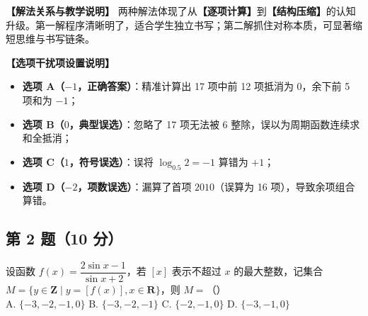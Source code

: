 \documentclass[11pt,a4paper,fontset=fandol]{ctexart}
\begin{document}
\begin{note}
\textbf{【解法关系与教学说明】}
两种解法体现了从\textbf{【逐项计算】}到\textbf{【结构压缩】}的认知升级。第一解程序清晰明了，适合学生独立书写；第二解抓住对称本质，可显著缩短思维与书写链条。
\end{note}

\begin{note}
\textbf{【选项干扰项设置说明】} 
\begin{itemize}[leftmargin=1.5em]
  \item \textbf{选项 A（$-1$，正确答案）}：精准计算出 17 项中前 12 项抵消为 0，余下前 5 项和为 $-1$；
  \item \textbf{选项 B（$0$，典型误选）}：忽略了 17 项无法被 6 整除，误以为周期函数连续求和全抵消；
  \item \textbf{选项 C（$1$，符号误选）}：误将 $\log_{0.5} 2 = -1$ 算错为 $+1$；
  \item \textbf{选项 D（$-2$，项数误选）}：漏算了首项 $2010$（误算为 16 项），导致余项组合算错。
\end{itemize}
\end{note}

\newpage
\subsection*{第 2 题（10 分）}

\begin{problembox}
设函数 \(f(x) = \dfrac{2\sin x - 1}{\sin x + 2}\)，若 \([x]\) 表示不超过 \(x\) 的最大整数，记集合 \(M = \{y \in \mathbf{Z} \mid y = [f(x)], x \in \mathbf{R}\}\)，则 \(M =\)（\qquad）\\[0.4em]
A. \(\{-3, -2, -1, 0\}\) \qquad\qquad B. \(\{-3, -2, -1\}\) \qquad\qquad C. \(\{-2, -1, 0\}\) \qquad\qquad D. \(\{-3, -1, 0\}\)
\end{problembox}
\end{document}
